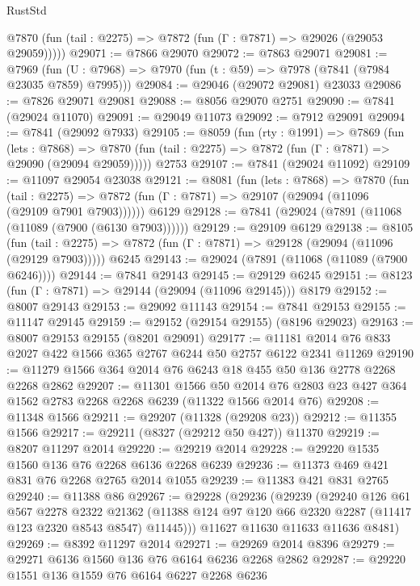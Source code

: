 \begin{lexlean}{RustStd}
\begin{coremodule}
{\begin{coremodule}
{{{{{{{{{{{{{{{{{{{{{{{{{{{{{{{{{{{{{{{{{{{{{{{{{{{{{{      @7870 (fun (tail : @2275) => @7872 (fun (Γ : @7871) => @29026 (@29053 @29059)))))
@29071 := @7866 @29070
@29072 := @7863 @29071
@29081 := @7969
    (fun (U : @7968) => @7970 (fun (t : @59) => @7978 (@7841 (@7984 @23035 @7859) @7995)))
@29084 := @29046 (@29072 @29081) @23033
@29086 := @7826 @29071 @29081
@29088 := @8056 @29070 @2751
@29090 := @7841 (@29024 @11070)
@29091 := @29049 @11073
@29092 := @7912 @29091
@29094 := @7841 (@29092 @7933)
@29105 := @8059
    (fun (rty : @1991) =>
    @7869
      (fun (lets : @7868) =>
      @7870 (fun (tail : @2275) => @7872 (fun (Γ : @7871) => @29090 (@29094 @29059)))))
    @2753
@29107 := @7841 (@29024 @11092)
@29109 := @11097 @29054 @23038
@29121 := @8081
    (fun (lets : @7868) =>
    @7870
      (fun (tail : @2275) =>
      @7872 (fun (Γ : @7871) => @29107 (@29094 (@11096 (@29109 @7901 @7903))))))
    @6129
@29128 := @7841 (@29024 (@7891 (@11068 (@11089 (@7900 (@6130 @7903))))))
@29129 := @29109 @6129
@29138 := @8105
    (fun (tail : @2275) => @7872 (fun (Γ : @7871) => @29128 (@29094 (@11096 (@29129 @7903)))))
    @6245
@29143 := @29024 (@7891 (@11068 (@11089 (@7900 @6246))))
@29144 := @7841 @29143
@29145 := @29129 @6245
@29151 := @8123 (fun (Γ : @7871) => @29144 (@29094 (@11096 @29145))) @8179
@29152 := @8007 @29143
@29153 := @29092 @11143
@29154 := @7841 @29153
@29155 := @11147 @29145
@29159 := @29152 (@29154 @29155) (@8196 @29023)
@29163 := @8007 @29153 @29155 (@8201 @29091)
@29177 := @11181 @2014 @76 @833 @2027 @422 @1566 @365 @2767 @6244 @50 @2757 @6122 @2341 @11269
@29190 := @11279 @1566 @364 @2014 @76 @6243 @18 @455 @50 @136 @2778 @2268 @2268 @2862
@29207 := @11301
    @1566
    @50
    @2014
    @76
    @2803
    @23
    @427
    @364
    @1562
    @2783
    @2268
    @2268
    @6239
    (@11322 @1566 @2014 @76)
@29208 := @11348 @1566
@29211 := @29207 (@11328 (@29208 @23))
@29212 := @11355 @1566
@29217 := @29211 (@8327 (@29212 @50 @427)) @11370
@29219 := @8207 @11297 @2014
@29220 := @29219 @2014
@29228 := @29220 @1535 @1560 @136 @76 @2268 @6136 @2268 @6239
@29236 := @11373 @469 @421 @831 @76 @2268 @2765 @2014 @1055
@29239 := @11383 @421 @831 @2765
@29240 := @11388 @86
@29267 := @29228
    (@29236
      (@29239
        (@29240
          @126
          @61
          @567
          @2278
          @2322
          @21362
          (@11388 @124 @97 @120 @66 @2320 @2287 (@11417 @123 @2320 @8543 @8547) @11445)))
      @11627
      @11630
      @11633
      @11636
      @8481)
@29269 := @8392 @11297 @2014
@29271 := @29269 @2014 @8396
@29279 := @29271 @6136 @1560 @136 @76 @6164 @6236 @2268 @2862
@29287 := @29220 @1551 @136 @1559 @76 @6164 @6227 @2268 @6236
}}}}}}}}}}}}}}}}}}}}}}}}}}}}}}}}}}}}}}}}}}}}}}}}}}}}}}
\end{coremodule}}
\end{coremodule}
\end{lexlean}
